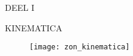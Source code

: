 
\null\thispagestyle{empty}

\vfill

\begin{center}
\textsc{DEEL I}
\end{center}
\begin{center}
\textsc{\LARGE KINEMATICA}
\end{center}

\vfill

\begin{figure}[h]
\centering
\texttt{[image: zon\_kinematica]}
\end{figure}

\vfill

\clearpage
\newpage
